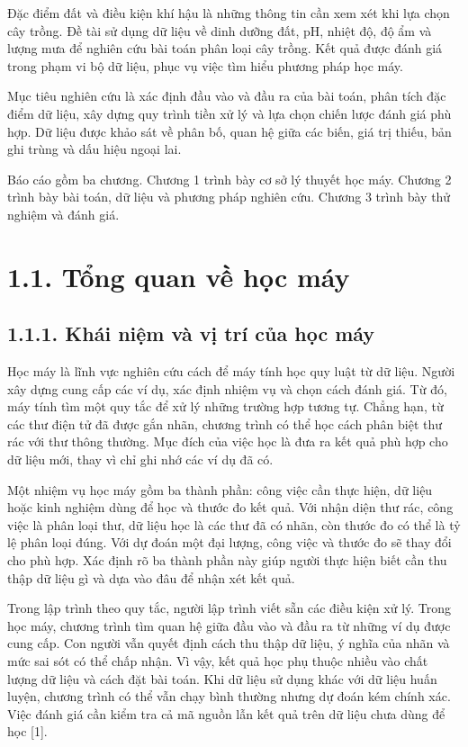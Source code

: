 
Đặc điểm đất và điều kiện khí hậu là những thông tin cần xem xét khi lựa chọn cây trồng. Đề tài sử dụng dữ liệu về dinh dưỡng đất, pH, nhiệt độ, độ ẩm và lượng mưa để nghiên cứu bài toán phân loại cây trồng. Kết quả được đánh giá trong phạm vi bộ dữ liệu, phục vụ việc tìm hiểu phương pháp học máy.


Mục tiêu nghiên cứu là xác định đầu vào và đầu ra của bài toán, phân tích đặc điểm dữ liệu, xây dựng quy trình tiền xử lý và lựa chọn chiến lược đánh giá phù hợp. Dữ liệu được khảo sát về phân bố, quan hệ giữa các biến, giá trị thiếu, bản ghi trùng và dấu hiệu ngoại lai.


Báo cáo gồm ba chương. Chương 1 trình bày cơ sở lý thuyết học máy. Chương 2 trình bày bài toán, dữ liệu và phương pháp nghiên cứu. Chương 3 trình bày thử nghiệm và đánh giá.



\section{1.1. Tổng quan về học máy}

\subsection{1.1.1. Khái niệm và vị trí của học máy}

Học máy là lĩnh vực nghiên cứu cách để máy tính học quy luật từ dữ liệu. Người xây dựng cung cấp các ví dụ, xác định nhiệm vụ và chọn cách đánh giá. Từ đó, máy tính tìm một quy tắc để xử lý những trường hợp tương tự. Chẳng hạn, từ các thư điện tử đã được gắn nhãn, chương trình có thể học cách phân biệt thư rác với thư thông thường. Mục đích của việc học là đưa ra kết quả phù hợp cho dữ liệu mới, thay vì chỉ ghi nhớ các ví dụ đã có.


Một nhiệm vụ học máy gồm ba thành phần: công việc cần thực hiện, dữ liệu hoặc kinh nghiệm dùng để học và thước đo kết quả. Với nhận diện thư rác, công việc là phân loại thư, dữ liệu học là các thư đã có nhãn, còn thước đo có thể là tỷ lệ phân loại đúng. Với dự đoán một đại lượng, công việc và thước đo sẽ thay đổi cho phù hợp. Xác định rõ ba thành phần này giúp người thực hiện biết cần thu thập dữ liệu gì và dựa vào đâu để nhận xét kết quả.


Trong lập trình theo quy tắc, người lập trình viết sẵn các điều kiện xử lý. Trong học máy, chương trình tìm quan hệ giữa đầu vào và đầu ra từ những ví dụ được cung cấp. Con người vẫn quyết định cách thu thập dữ liệu, ý nghĩa của nhãn và mức sai sót có thể chấp nhận. Vì vậy, kết quả học phụ thuộc nhiều vào chất lượng dữ liệu và cách đặt bài toán. Khi dữ liệu sử dụng khác với dữ liệu huấn luyện, chương trình có thể vẫn chạy bình thường nhưng dự đoán kém chính xác. Việc đánh giá cần kiểm tra cả mã nguồn lẫn kết quả trên dữ liệu chưa dùng để học [1].


